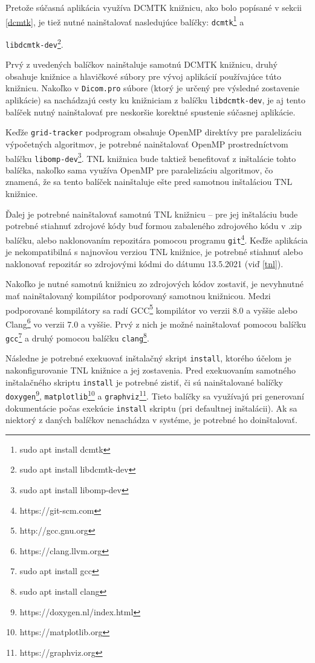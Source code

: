 Pretože súčasná aplikácia využíva DCMTK knižnicu, ako bolo popísané v sekcii \ref{dcmtk}, je tiež nutné nainštalovať nasledujúce balíčky: \texttt{dcmtk}\footnote{sudo apt install dcmtk} \newline a {\texttt{libdcmtk-dev}\footnote{sudo apt install libdcmtk-dev}.

Prvý z uvedených balíčkov nainštaluje samotnú DCMTK knižnicu, druhý obsahuje knižnice a hlavičkové súbory pre vývoj aplikácií používajúce túto knižnicu. Nakoľko v \texttt{Dicom.pro} súbore (ktorý je určený pre výsledné zostavenie aplikácie) sa nachádzajú cesty ku knižniciam z balíčku \texttt{libdcmtk-dev}, je aj tento balíček nutný nainštalovať pre neskoršie korektné spustenie súčasnej aplikácie.

Keďže \texttt{grid-tracker} podprogram obsahuje OpenMP direktívy pre paralelizáciu výpočetných algoritmov, je potrebné nainštalovať OpenMP prostredníctvom balíčku \texttt{libomp-dev}\footnote{sudo apt install libomp-dev}. TNL knižnica bude taktiež benefitovať z inštalácie tohto balíčka, nakoľko sama využíva OpenMP pre paralelizáciu algoritmov, čo znamená, že sa tento balíček nainštaluje ešte pred samotnou inštaláciou TNL knižnice.

Ďalej je potrebné nainštalovať samotnú TNL knižnicu -- pre jej inštaláciu bude potrebné stiahnuť zdrojové kódy buď formou zabaleného zdrojového kódu v .zip balíčku, alebo naklonovaním repozitára pomocou programu \texttt{git}\footnote{https://git-scm.com}. Keďže aplikácia je nekompatibilná s najnovšou verziou TNL knižnice, je potrebné stiahnuť alebo naklonovať repozitár so zdrojovými kódmi do dátumu 13.5.2021 (viď \ref{tnl}).

Nakoľko je nutné samotnú knižnicu zo zdrojových kódov zostaviť, je nevyhnutné mať nainštalovaný kompilátor podporovaný samotnou knižnicou. Medzi podporované kompilátory sa radí GCC\footnote{http://gcc.gnu.org} kompilátor vo verzii 8.0 a vyššie alebo Clang\footnote{https://clang.llvm.org} vo verzii 7.0 a vyššie. Prvý z nich je možné nainštalovať pomocou balíčku \texttt{gcc}\footnote{sudo apt install gcc} a druhý pomocou balíčku \texttt{clang}\footnote{sudo apt install clang}.

Následne je potrebné exekuovať inštalačný skript \texttt{install}, ktorého účelom je nakonfigurovanie TNL knižnice a jej zostavenia.
Pred exekuovaním samotného inštalačného skriptu \texttt{install} je potrebné zistiť, či sú nainštalované balíčky \texttt{doxygen}\footnote{https://doxygen.nl/index.html}, \texttt{matplotlib}\footnote{https://matplotlib.org} a \texttt{graphviz}\footnote{https://graphviz.org}. Tieto balíčky sa využívajú pri generovaní dokumentácie počas exekúcie \texttt{install} skriptu (pri defaultnej inštalácii). Ak sa niektorý z daných balíčkov nenachádza v systéme, je potrebné ho doinštalovať.

}
